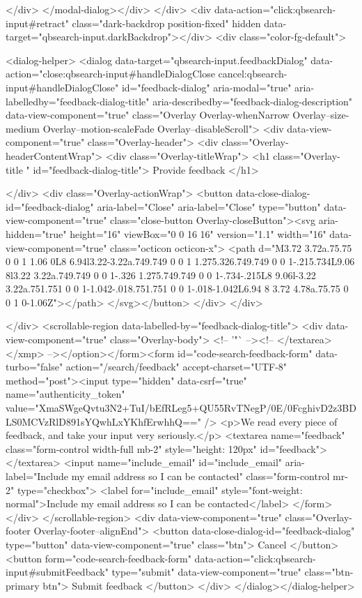     </div>
</modal-dialog></div>
  </div>
  <div data-action="click:qbsearch-input#retract" class="dark-backdrop position-fixed" hidden data-target="qbsearch-input.darkBackdrop"></div>
  <div class="color-fg-default">
    
<dialog-helper>
  <dialog data-target="qbsearch-input.feedbackDialog" data-action="close:qbsearch-input#handleDialogClose cancel:qbsearch-input#handleDialogClose" id="feedback-dialog" aria-modal="true" aria-labelledby="feedback-dialog-title" aria-describedby="feedback-dialog-description" data-view-component="true" class="Overlay Overlay-whenNarrow Overlay--size-medium Overlay--motion-scaleFade Overlay--disableScroll">
    <div data-view-component="true" class="Overlay-header">
  <div class="Overlay-headerContentWrap">
    <div class="Overlay-titleWrap">
      <h1 class="Overlay-title " id="feedback-dialog-title">
        Provide feedback
      </h1>
        
    </div>
    <div class="Overlay-actionWrap">
      <button data-close-dialog-id="feedback-dialog" aria-label="Close" aria-label="Close" type="button" data-view-component="true" class="close-button Overlay-closeButton"><svg aria-hidden="true" height="16" viewBox="0 0 16 16" version="1.1" width="16" data-view-component="true" class="octicon octicon-x">
    <path d="M3.72 3.72a.75.75 0 0 1 1.06 0L8 6.94l3.22-3.22a.749.749 0 0 1 1.275.326.749.749 0 0 1-.215.734L9.06 8l3.22 3.22a.749.749 0 0 1-.326 1.275.749.749 0 0 1-.734-.215L8 9.06l-3.22 3.22a.751.751 0 0 1-1.042-.018.751.751 0 0 1-.018-1.042L6.94 8 3.72 4.78a.75.75 0 0 1 0-1.06Z"></path>
</svg></button>
    </div>
  </div>
  
</div>
      <scrollable-region data-labelled-by="feedback-dialog-title">
        <div data-view-component="true" class="Overlay-body">        <!-- '"` --><!-- </textarea></xmp> --></option></form><form id="code-search-feedback-form" data-turbo="false" action="/search/feedback" accept-charset="UTF-8" method="post"><input type="hidden" data-csrf="true" name="authenticity_token" value="XmaSWgeQvtu3N2+TuI/bEfRLeg5+QU55RvTNegP/0E/0FcghivD2z3BDLS0MCVzRlD891sYQwhLxYKhfErwhhQ==" />
          <p>We read every piece of feedback, and take your input very seriously.</p>
          <textarea name="feedback" class="form-control width-full mb-2" style="height: 120px" id="feedback"></textarea>
          <input name="include_email" id="include_email" aria-label="Include my email address so I can be contacted" class="form-control mr-2" type="checkbox">
          <label for="include_email" style="font-weight: normal">Include my email address so I can be contacted</label>
</form></div>
      </scrollable-region>
      <div data-view-component="true" class="Overlay-footer Overlay-footer--alignEnd">          <button data-close-dialog-id="feedback-dialog" type="button" data-view-component="true" class="btn">    Cancel
</button>
          <button form="code-search-feedback-form" data-action="click:qbsearch-input#submitFeedback" type="submit" data-view-component="true" class="btn-primary btn">    Submit feedback
</button>
</div>
</dialog></dialog-helper>

